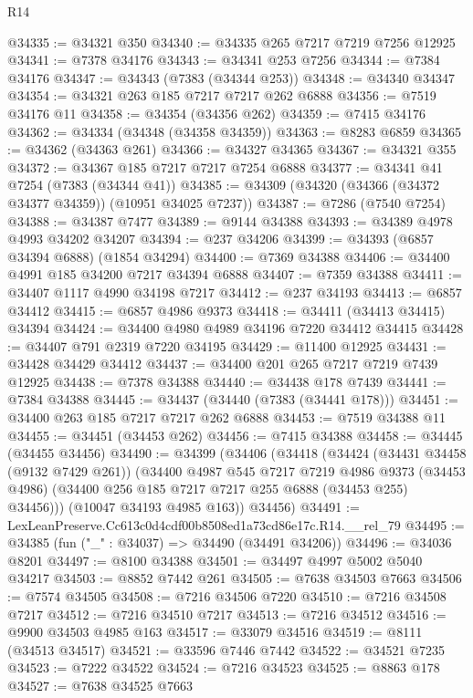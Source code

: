 \begin{lexlean}{R14}
\begin{coremodule}
@34335 := @34321 @350
@34340 := @34335 @265 @7217 @7219 @7256 @12925
@34341 := @7378 @34176
@34343 := @34341 @253 @7256
@34344 := @7384 @34176
@34347 := @34343 (@7383 (@34344 @253))
@34348 := @34340 @34347
@34354 := @34321 @263 @185 @7217 @7217 @262 @6888
@34356 := @7519 @34176 @11
@34358 := @34354 (@34356 @262)
@34359 := @7415 @34176
@34362 := @34334 (@34348 (@34358 @34359))
@34363 := @8283 @6859
@34365 := @34362 (@34363 @261)
@34366 := @34327 @34365
@34367 := @34321 @355
@34372 := @34367 @185 @7217 @7217 @7254 @6888
@34377 := @34341 @41 @7254 (@7383 (@34344 @41))
@34385 := @34309 (@34320 (@34366 (@34372 @34377 @34359)) (@10951 @34025 @7237))
@34387 := @7286 (@7540 @7254)
@34388 := @34387 @7477
@34389 := @9144 @34388
@34393 := @34389 @4978 @4993 @34202 @34207
@34394 := @237 @34206
@34399 := @34393 (@6857 @34394 @6888) (@1854 @34294)
@34400 := @7369 @34388
@34406 := @34400 @4991 @185 @34200 @7217 @34394 @6888
@34407 := @7359 @34388
@34411 := @34407 @1117 @4990 @34198 @7217
@34412 := @237 @34193
@34413 := @6857 @34412
@34415 := @6857 @4986 @9373
@34418 := @34411 (@34413 @34415) @34394
@34424 := @34400 @4980 @4989 @34196 @7220 @34412 @34415
@34428 := @34407 @791 @2319 @7220 @34195
@34429 := @11400 @12925
@34431 := @34428 @34429 @34412
@34437 := @34400 @201 @265 @7217 @7219 @7439 @12925
@34438 := @7378 @34388
@34440 := @34438 @178 @7439
@34441 := @7384 @34388
@34445 := @34437 (@34440 (@7383 (@34441 @178)))
@34451 := @34400 @263 @185 @7217 @7217 @262 @6888
@34453 := @7519 @34388 @11
@34455 := @34451 (@34453 @262)
@34456 := @7415 @34388
@34458 := @34445 (@34455 @34456)
@34490 := @34399
    (@34406
      (@34418
        (@34424
          (@34431 @34458 (@9132 @7429 @261))
          (@34400
            @4987
            @545
            @7217
            @7219
            @4986
            @9373
            (@34453 @4986)
            (@34400 @256 @185 @7217 @7217 @255 @6888 (@34453 @255) @34456)))
        (@10047 @34193 @4985 @163))
      @34456)
@34491 := LexLeanPreserve.Cc613c0d4cdf00b8508ed1a73cd86e17c.R14.__rel_79
@34495 := @34385 (fun ("_" : @34037) => @34490 (@34491 @34206))
@34496 := @34036 @8201
@34497 := @8100 @34388
@34501 := @34497 @4997 @5002 @5040 @34217
@34503 := @8852 @7442 @261
@34505 := @7638 @34503 @7663
@34506 := @7574 @34505
@34508 := @7216 @34506 @7220
@34510 := @7216 @34508 @7217
@34512 := @7216 @34510 @7217
@34513 := @7216 @34512
@34516 := @9900 @34503 @4985 @163
@34517 := @33079 @34516
@34519 := @8111 (@34513 @34517)
@34521 := @33596 @7446 @7442
@34522 := @34521 @7235
@34523 := @7222 @34522
@34524 := @7216 @34523
@34525 := @8863 @178
@34527 := @7638 @34525 @7663

\end{coremodule}
\end{lexlean}
